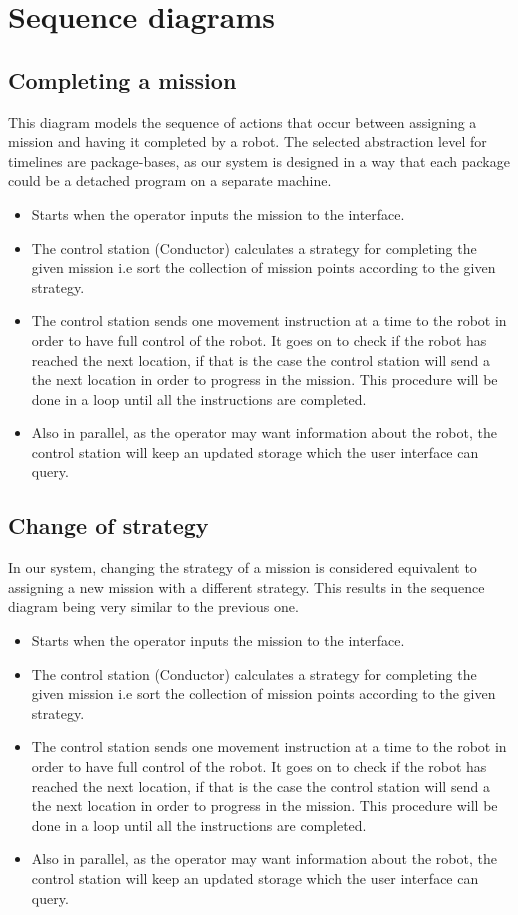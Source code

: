 \section{Sequence diagrams}
\subsection{Completing a mission}
  This diagram models the sequence of actions that occur between assigning a mission and having it completed by a robot. The selected abstraction level for timelines are package-bases, as our system is designed in a way that each package could be a detached program on a separate machine.
 \begin{itemize}
    \item Starts when the operator inputs the mission to the interface.
    \item The control station (Conductor) calculates a strategy for completing the given mission i.e sort the collection of mission points according to the given strategy.
    \item The control station sends one movement instruction at a time to the robot in order to have full control of the robot. It goes on to check if the robot has reached the next location, if that is the case the control station will send a the next location in order to progress in the mission. This procedure will be done in a loop until all the instructions are completed.
    \item Also in parallel, as the operator may want information about the robot, the control station will keep an updated storage which the user interface can query.
\end{itemize}
\subsection{Change of strategy}
In our system, changing the strategy of a mission is considered equivalent to assigning a new mission with a different strategy. This results in the sequence diagram being very similar to the previous one.
\begin{itemize}
    \item Starts when the operator inputs the mission to the interface.
    \item The control station (Conductor) calculates a strategy for completing the given mission i.e sort the collection of mission points according to the given strategy.
    \item The control station sends one movement instruction at a time to the robot in order to have full control of the robot. It goes on to check if the robot has reached the next location, if that is the case the control station will send a the next location in order to progress in the mission. This procedure will be done in a loop until all the instructions are completed.
    \item Also in parallel, as the operator may want information about the robot, the control station will keep an updated storage which the user interface can query.
\end{itemize}
